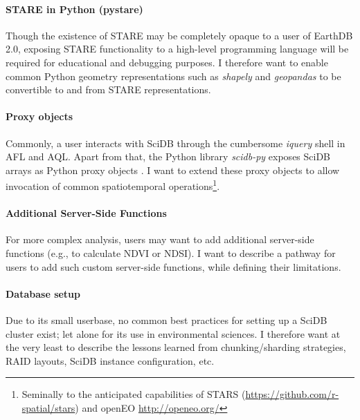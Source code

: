 \documentclass[letterpaper, parskip=half]{scrartcl}
\begin{document}
\paragraph{STARE in Python (pystare)}
Though the existence of STARE may be completely opaque to a user of EarthDB 2.0, exposing STARE functionality to a high-level programming language will be required for educational and debugging purposes. I therefore want to enable common Python geometry representations such as \textit{shapely} and \textit{geopandas} to be convertible to and from STARE representations.

\paragraph{Proxy objects}
Commonly, a user interacts with SciDB through the cumbersome \textit{iquery} shell in \gls{AFL} and \gls{AQL}. 
Apart from that, the Python library \textit{scidb-py} exposes SciDB arrays as Python proxy objects . 
I want to extend these proxy objects to allow invocation of common spatiotemporal operations\footnote{Seminally to the anticipated capabilities of STARS (\url{https://github.com/r-spatial/stars}) and openEO \url{http://openeo.org/}}.

\paragraph{Additional Server-Side Functions}
For more complex analysis, users may want to add additional server-side functions (e.g., to calculate \gls{NDVI} or \gls{NDSI}). I want to describe a pathway for users to add such custom server-side functions, while defining their limitations.

\paragraph{Database setup}
Due to its small userbase, no common best practices for setting up a SciDB cluster exist; let alone for its use in environmental sciences. I therefore want at the very least to describe the lessons learned from chunking/sharding strategies, RAID layouts, SciDB instance configuration, etc.



\end{document}
